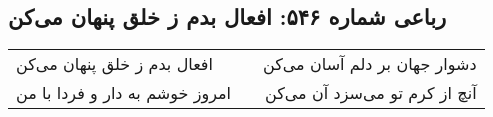 \begin{center}
\section*{رباعی شماره ۵۴۶: افعال بدم ز خلق پنهان می‌کن}
\label{sec:sh546}
\begin{longtable}{l p{0.5cm} r}
افعال بدم ز خلق پنهان می‌کن
&&
دشوار جهان بر دلم آسان می‌کن
\\
امروز خوشم به دار و فردا با من
&&
آنچ از کرم تو می‌سزد آن می‌کن
\\
\end{longtable}
\end{center}

